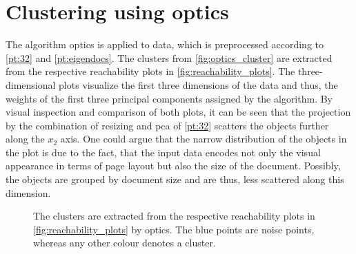 \section{Clustering using \acs{optics}}\label{sec:evaluation-OPTICS}
The algorithm \ac{optics} is applied to data, which is preprocessed according to \autoref{pt:32} and \autoref{pt:eigendocs}.
The clusters from \autoref{fig:optics_cluster} are extracted from the respective reachability plots in \autoref{fig:reachability_plots}.
The three-dimensional plots visualize the first three dimensions of the data and thus, the weights of the first three principal components assigned by the \eigendocs{} algorithm.
By visual inspection and comparison of both plots, 
it can be seen that the projection by the combination of resizing and \ac{pca} of \autoref{pt:32} scatters the objects further along the $x_2$ axis.
One could argue that the narrow distribution of the objects in the \eigendocs{} plot is due to the fact, 
that the input data encodes not only the visual appearance in terms of page layout but also the size of the document.
Possibly, the objects are grouped by document size and are thus, less scattered along this dimension.

\begin{figure}%
    \centering
    \qquad
    \caption[\ac{optics} clusters]{The clusters are extracted from the respective reachability plots in \autoref{fig:reachability_plots} by \ac{optics}.
    The blue points are noise points, whereas any other colour denotes a cluster.}%
    \label{fig:optics_cluster}%
\end{figure}



